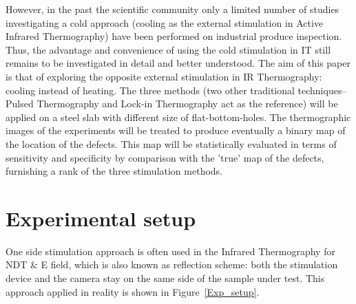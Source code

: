\documentclass[]{spie}  %
\begin{document}
However, in the past the scientific community only a limited number of studies investigating a cold approach (cooling as the external stimulation in Active Infrared Thermography) have been performed on industrial produce inspection\cite{endohdynamical2012,2012-LewisHom,Lei2016detection}. Thus, the advantage and convenience of using the cold stimulation in IT still remains to be investigated in detail and better understood. The aim of this paper is that of exploring the opposite external stimulation in IR Thermography: cooling instead of heating. The three methods (two other traditional techniques--Pulsed Thermography and Lock-in Thermography act as the reference) will be applied on a steel slab with different size of flat-bottom-holes. The thermographic images of the experiments will be  treated to produce eventually a binary map of the location of the defects. This map will be statistically evaluated in terms of sensitivity and specificity\cite{Fawcett2006} by comparison with the ’true’ map of the defects, furnishing a rank of the three stimulation methods. 



\section{Experimental setup} %
\label{sec:experimental_setup}
One side stimulation approach is often used in the Infrared Thermography for NDT \& E field, which is also known as reflection scheme: both the stimulation device and the camera stay on the same side of the sample under test. This approach applied in reality is shown in Figure~\ref{Exp_setup}.
\end{document}
